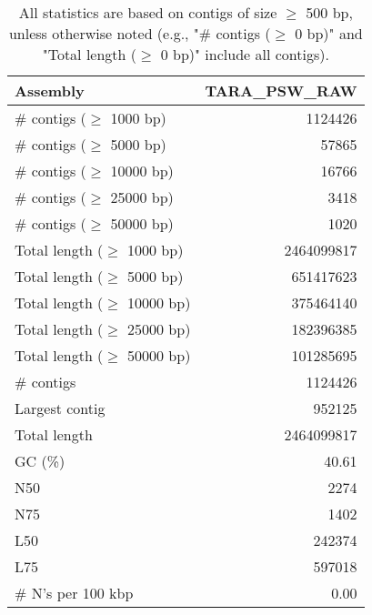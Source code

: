 \documentclass[12pt,a4paper]{article}
\begin{document}
\begin{table}[ht]
\begin{center}
\caption{All statistics are based on contigs of size $\geq$ 500 bp, unless otherwise noted (e.g., "\# contigs ($\geq$ 0 bp)" and "Total length ($\geq$ 0 bp)" include all contigs).}
\begin{tabular}{|l*{1}{|r}|}
\hline
Assembly & TARA\_PSW\_RAW \\ \hline
\# contigs ($\geq$ 1000 bp) & 1124426 \\ \hline
\# contigs ($\geq$ 5000 bp) & 57865 \\ \hline
\# contigs ($\geq$ 10000 bp) & 16766 \\ \hline
\# contigs ($\geq$ 25000 bp) & 3418 \\ \hline
\# contigs ($\geq$ 50000 bp) & 1020 \\ \hline
Total length ($\geq$ 1000 bp) & 2464099817 \\ \hline
Total length ($\geq$ 5000 bp) & 651417623 \\ \hline
Total length ($\geq$ 10000 bp) & 375464140 \\ \hline
Total length ($\geq$ 25000 bp) & 182396385 \\ \hline
Total length ($\geq$ 50000 bp) & 101285695 \\ \hline
\# contigs & 1124426 \\ \hline
Largest contig & 952125 \\ \hline
Total length & 2464099817 \\ \hline
GC (\%) & 40.61 \\ \hline
N50 & 2274 \\ \hline
N75 & 1402 \\ \hline
L50 & 242374 \\ \hline
L75 & 597018 \\ \hline
\# N's per 100 kbp & 0.00 \\ \hline
\end{tabular}
\end{center}
\end{table}
\end{document}
